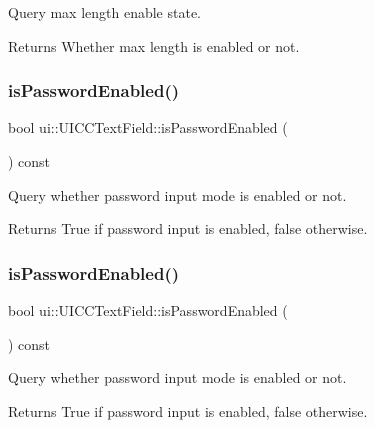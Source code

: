 Query max length enable state. \begin{DoxyReturn}{Returns}
Whether max length is enabled or not. 
\end{DoxyReturn}
\mbox{\label{classui_1_1UICCTextField_a993531ac778c06a81f91cd465edd72ef}} 
\subsubsection{\texorpdfstring{is\+Password\+Enabled()}{isPasswordEnabled()}\hspace{0.1cm}{\footnotesize\ttfamily [1/2]}}
{\footnotesize\ttfamily bool ui\+::\+U\+I\+C\+C\+Text\+Field\+::is\+Password\+Enabled (\begin{DoxyParamCaption}{ }\end{DoxyParamCaption}) const}



Query whether password input mode is enabled or not. 

\begin{DoxyReturn}{Returns}
True if password input is enabled, false otherwise. 
\end{DoxyReturn}
\mbox{\label{classui_1_1UICCTextField_a993531ac778c06a81f91cd465edd72ef}} 
\subsubsection{\texorpdfstring{is\+Password\+Enabled()}{isPasswordEnabled()}\hspace{0.1cm}{\footnotesize\ttfamily [2/2]}}
{\footnotesize\ttfamily bool ui\+::\+U\+I\+C\+C\+Text\+Field\+::is\+Password\+Enabled (\begin{DoxyParamCaption}{ }\end{DoxyParamCaption}) const}



Query whether password input mode is enabled or not. 

\begin{DoxyReturn}{Returns}
True if password input is enabled, false otherwise. 
\end{DoxyReturn}
\mbox{\label{classui_1_1UICCTextField_ad74c8dfb537f983d2540af7c5b9cb307}} 
